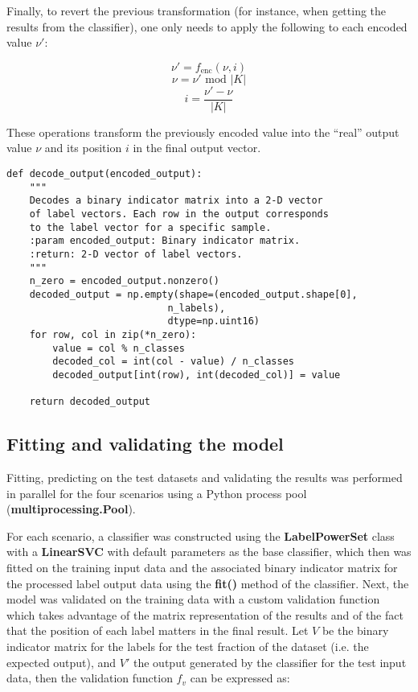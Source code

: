 \documentclass{kthreport}
\theoremstyle{definition}
\begin{document}
Finally, to revert the previous transformation (for instance, when getting the results from the classifier), one only needs to apply the following to each encoded value $\nu'$:

\[ \nu' = f_{\text{enc}}(\nu, i) \]
\[ \nu = \nu' \text{ mod } |K| \]
\[ i = \frac{\nu' - \nu}{|K|} \]

These operations transform the previously encoded value into the ``real'' output value $\nu$ and its position $i$ in the final output vector.

\begin{figure*}
	\begin{lstlisting}[style=MyPython, caption={Decoding function in Python, which takes a binary indicator matrix and extracts and decodes the encoded values within into the original data format.}]
def decode_output(encoded_output):
	"""
	Decodes a binary indicator matrix into a 2-D vector 
	of label vectors. Each row in the output corresponds 
	to the label vector for a specific sample.
	:param encoded_output: Binary indicator matrix.
	:return: 2-D vector of label vectors.
	"""
	n_zero = encoded_output.nonzero()
	decoded_output = np.empty(shape=(encoded_output.shape[0],
							n_labels),
							dtype=np.uint16)
	for row, col in zip(*n_zero):
		value = col % n_classes
		decoded_col = int(col - value) / n_classes
		decoded_output[int(row), int(decoded_col)] = value
	
	return decoded_output
	\end{lstlisting}
\end{figure*}

\subsection{Fitting and validating the model}

Fitting, predicting on the test datasets and validating the results was performed in parallel for the four scenarios using a Python process pool (\textbf{multiprocessing.Pool}). 

For each scenario, a classifier was constructed using the \textbf{LabelPowerSet} class with a \textbf{LinearSVC} with default parameters as the base classifier, which then was fitted on the training input data and the associated binary indicator matrix for the processed label output data using the \textbf{fit()} method of the classifier.
Next, the model was validated on the training data with a custom validation function which takes advantage of the matrix representation of the results and of the fact that the position of each label matters in the final result. Let $V$ be the binary indicator matrix for the labels for the test fraction of the dataset (i.e. the expected output), and $V'$ the output generated by the classifier for the test input data, then the validation function $f_{v}$ can be expressed as:
\end{document}
